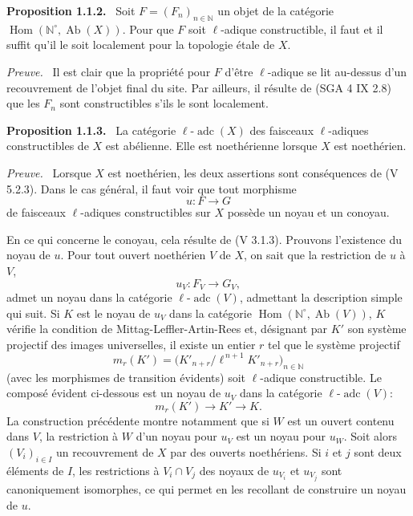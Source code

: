 \documentclass[11pt]{article}
\newenvironment{statement}[1]{\par\medskip\noindent\textbf{#1.}\ }{\par\medskip}
\newenvironment{prooftext}[1][Proof]{\par\noindent\emph{#1.}\ }{\par\medskip}
\DeclareMathOperator{\Hom}{Hom}
\providecommand{\Hom}{\operatorname{Hom}}
\providecommand{\Ab}{\operatorname{Ab}}
\providecommand{\adc}{\operatorname{adc}}
\providecommand{\Ab}{\operatorname{Ab}}
\begin{document}
\begin{statement}{Proposition 1.1.2}
Soit \(F=(F_n)_{n\in\mathbb N}\) un objet de la catégorie \(\Hom(\mathbb N^\circ,\Ab(X))\). Pour que \(F\) soit \(\ell\)-adique constructible, il faut et il suffit qu'il le soit localement pour la topologie étale de \(X\).
\end{statement}

\begin{prooftext}[Preuve]
Il est clair que la propriété pour \(F\) d'être \(\ell\)-adique se lit au-dessus d'un recouvrement de l'objet final du site. Par ailleurs, il résulte de (SGA 4 IX 2.8) que les \(F_n\) sont constructibles s'ils le sont localement.
\end{prooftext}

\begin{statement}{Proposition 1.1.3}
La catégorie \(\ell\text{-}\adc(X)\) des faisceaux \(\ell\)-adiques constructibles de \(X\) est abélienne. Elle est noethérienne lorsque \(X\) est noethérien.
\end{statement}

\begin{prooftext}[Preuve]
Lorsque \(X\) est noethérien, les deux assertions sont conséquences de (V 5.2.3). Dans le cas général, il faut voir que tout morphisme
\[
u:F\longrightarrow G
\]
de faisceaux \(\ell\)-adiques constructibles sur \(X\) possède un noyau et un conoyau.

En ce qui concerne le conoyau, cela résulte de (V 3.1.3). Prouvons l'existence du noyau de \(u\). Pour tout ouvert noethérien \(V\) de \(X\), on sait que la restriction de \(u\) à \(V\),
\[
u_V:F_V\longrightarrow G_V,
\]
admet un noyau dans la catégorie \(\ell\text{-}\adc(V)\), admettant la description simple qui suit. Si \(K\) est le noyau de \(u_V\) dans la catégorie \(\Hom(\mathbb N^\circ,\Ab(V))\), \(K\) vérifie la condition de Mittag-Leffler-Artin-Rees et, désignant par \(K'\) son système projectif des images universelles, il existe un entier \(r\) tel que le système projectif
\[
m_r(K')=\bigl(K'_{n+r}/\ell^{\,n+1}K'_{n+r}\bigr)_{n\in\mathbb N}
\]
(avec les morphismes de transition évidents) soit \(\ell\)-adique constructible. Le composé évident ci-dessous est un noyau de \(u_V\) dans la catégorie \(\ell\text{-}\adc(V)\):
\[
m_r(K')\longrightarrow K'\longrightarrow K.
\]
La construction précédente montre notamment que si \(W\) est un ouvert contenu dans \(V\), la restriction à \(W\) d'un noyau pour \(u_V\) est un noyau pour \(u_W\). Soit alors \((V_i)_{i\in I}\) un recouvrement de \(X\) par des ouverts noethériens. Si \(i\) et \(j\) sont deux éléments de \(I\), les restrictions à \(V_i\cap V_j\) des noyaux de \(u_{V_i}\) et \(u_{V_j}\) sont canoniquement isomorphes, ce qui permet en les recollant de construire un noyau de \(u\).
\end{prooftext}
\end{document}
